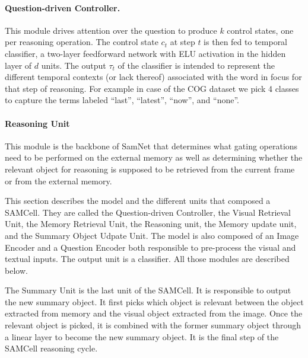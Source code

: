 \paragraph{Question-driven Controller.}

%

This module drives attention over the question to produce $k$ control states, one per reasoning operation. 
The control state $c_t$ at step $t$ is then fed to temporal classifier, a two-layer feedforward network with ELU activation in the hidden layer of $d$ units.
The output $\tau_t$ of the classifier is intended to represent the different temporal contexts (or lack thereof) associated with the word in focus for that step of reasoning.	
For example in case of the COG dataset we pick 4 classes to capture the terms labeled ``last'', ``latest'', ``now'', and ``none''.

\paragraph{Reasoning Unit}
This module is the backbone of SamNet that determines what gating operations need to be performed on the external memory as well as determining whether the relevant object for reasoning is supposed to be retrieved from the current frame or from the external memory.

This section describes the model and the different units that composed a SAMCell. They are called the Question-driven Controller, the Visual Retrieval Unit, the Memory Retrieval Unit, the Reasoning unit, the Memory update unit, and the Summary Object Udpate Unit. 
The model is also composed of an Image Encoder and a Question Encoder both responsible to pre-process the visual and textual inputs. The output unit is a classifier.
All those modules are described below.



The  Summary Unit is the last unit of the SAMCell. It is responsible to output the new summary object. It first picks which object is relevant between the object extracted from memory and the visual object extracted from the image. Once the relevant object is picked, it is combined with the former summary object through a linear layer to become the new summary object. It is the final step of the SAMCell reasoning cycle. 


